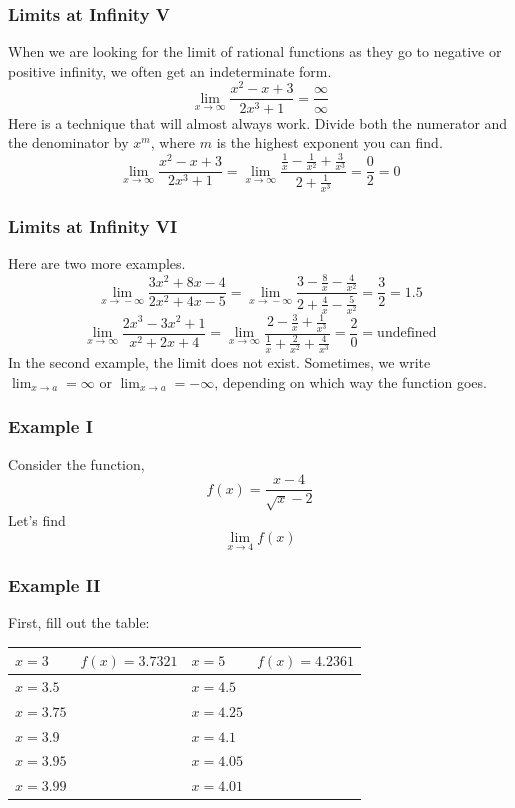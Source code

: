\documentclass[xcolor=dvipsnames]{beamer}
\begin{document}
\begin{frame}
  \frametitle{Limits at Infinity V}
When we are looking for the limit of rational functions as they go to
negative or positive infinity, we often get an indeterminate form.
\begin{equation}
  \label{eq:airoovae}
  \lim_{x\rightarrow\infty}\frac{x^{2}-x+3}{2x^{3}+1}=\frac{\infty}{\infty}
\end{equation}
Here is a technique that will almost always work. Divide both the
numerator and the denominator by $x^{m}$, where $m$ is the highest
exponent you can find.
\begin{equation}
  \label{eq:ahrahnei}
  \lim_{x\rightarrow\infty}\frac{x^{2}-x+3}{2x^{3}+1}=\lim_{x\rightarrow\infty}\frac{\frac{1}{x}-\frac{1}{x^{2}}+\frac{3}{x^{3}}}{2+\frac{1}{x^{3}}}=\frac{0}{2}=0
\end{equation}
\end{frame}

\begin{frame}
  \frametitle{Limits at Infinity VI}
Here are two more examples.
\begin{equation}
  \label{eq:ikiegeip}
  \lim_{x\rightarrow{}-\infty}\frac{3x^{2}+8x-4}{2x^{2}+4x-5}=\lim_{x\rightarrow{}-\infty}\frac{3-\frac{8}{x}-\frac{4}{x^{2}}}{2+\frac{4}{x}-\frac{5}{x^{2}}}=\frac{3}{2}=1.5
\end{equation}
\begin{equation}
  \label{eq:deegiech}
  \lim_{x\rightarrow{}\infty}\frac{2x^{3}-3x^{2}+1}{x^{2}+2x+4}=\lim_{x\rightarrow{}\infty}\frac{2-\frac{3}{x}+\frac{1}{x^{3}}}{\frac{1}{x}+\frac{2}{x^{2}}+\frac{4}{x^{3}}}=\frac{2}{0}=\mbox{undefined}
\end{equation}
In the second example, the limit does not exist. Sometimes, we write
$\lim_{x\rightarrow{}a}=\infty$ or $\lim_{x\rightarrow{}a}=-\infty$,
depending on which way the function goes.
\end{frame}

\begin{frame}
  \frametitle{Example I}
Consider the function,
\begin{equation}
  \label{eq:shuungae}
  f(x)=\frac{x-4}{\sqrt{x}-2}
\end{equation}
Let's find
\begin{equation}
  \label{eq:ailuiquo}
  \lim_{x\rightarrow{}4}f(x)
\end{equation}
\end{frame}

\begin{frame}
  \frametitle{Example II}
First, fill out the table:

\begin{tabular}{|l|l|l|l|}\hline
  $x=3$ & $f(x)= 3.7321$ & $x=5$ & $f(x)=4.2361$ \\ \hline
  $x=3.5$ & & $x=4.5$ &  \\ \hline
  $x=3.75$ & & $x=4.25$ & \\ \hline
  $x=3.9$ &  & $x=4.1$ & \\ \hline
  $x=3.95$ & & $x=4.05$ & \\ \hline
  $x=3.99$ & & $x=4.01$ & \\ \hline
\end{tabular}
\end{frame}
\end{document}
